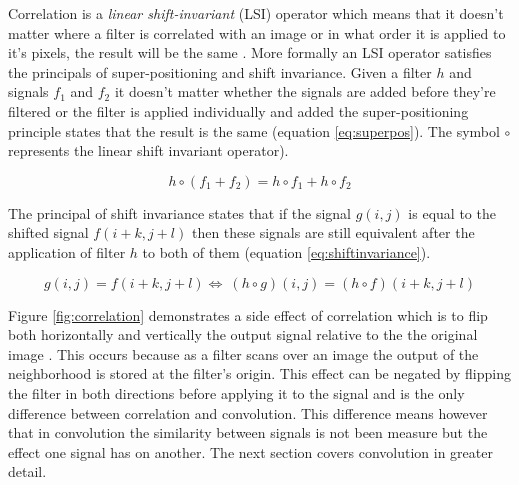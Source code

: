 Correlation is a \emph{linear shift-invariant} (LSI) operator which means that it doesn't matter where a filter is correlated with an image or in what order it is applied to it's pixels, the result will be the same \cite{cv_matlab}. More formally an LSI operator satisfies the principals of super-positioning and shift invariance. Given a filter $h$ and signals $f_1$ and $f_2$ it doesn't matter whether the signals are added before they're filtered or the filter is applied individually and added the super-positioning principle states that the result is the same (equation \ref{eq:superpos}). The symbol $\circ$ represents the linear shift invariant operator).

\begin{equation}
  \label{eq:superpos}
  h\circ(f_1 + f_2) = h\circ f_1 + h\circ f_2
\end{equation}

The principal of shift invariance states that if the signal $g(i,j)$ is equal to the shifted signal $f(i+k,j+l)$ then these signals are still equivalent after the application of filter $h$ to both of them (equation \ref{eq:shiftinvariance}).

\begin{equation}
  \label{eq:shiftinvariance}
  g(i,j)=f(i+k,j+l) \Leftrightarrow\ (h\circ g)(i,j)=(h\circ f)(i+k,j+l)
\end{equation}

Figure \ref{fig:correlation} demonstrates a side effect of correlation which is to flip both horizontally and vertically the output signal relative to the the original image \cite{udacity_cv}. This occurs because as a filter scans over an image the output of the neighborhood is stored at the filter's origin. This effect can be negated by flipping the filter in both directions before applying it to the signal and is the only difference between correlation and convolution. This difference means however that in convolution the similarity between signals is not been measure but the effect one signal has on another. The next section covers convolution in greater detail.


